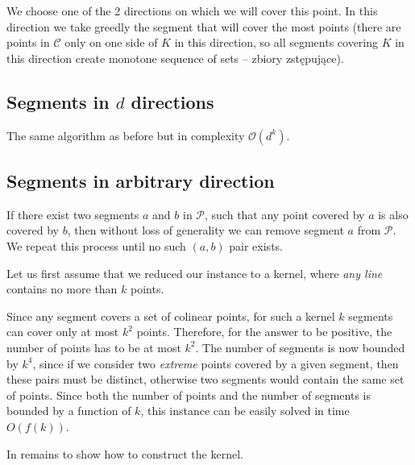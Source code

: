 \documentclass[en]{pracamgr}
\newcommand{\points}{\mathcal{C}}
\newcommand{\sets}{\mathcal{P}}
\begin{document}
We choose one of the 2 directions on which we will cover this point.
In this direction we take greedly the segment that will cover
the most points (there are points in $\points$ only on
one side of $K$ in this direction, so all
segments covering $K$ in this direction create monotone sequence
of sets -- zbiory zstępujące).

\subsection{Segments in $d$ directions}
The same algorithm as before but in complexity $\mathcal{O}(d^k)$.

\subsection{Segments in arbitrary direction}
If there exist two segments $a$ and $b$ in $\sets$,
such that any point covered by $a$ is also covered by $b$,
then without loss of generality we can remove segment $a$ from $\sets$.
We repeat this process until no such $(a, b)$ pair exists.


Let us first assume that we reduced our instance to a kernel,
where \textit{any line} contains no more than $k$ points.

Since any segment covers a set of colinear points,
for such a kernel $k$ segments can cover only at most $k^2$ points.
Therefore, for the answer to be positive,
the number of points has to be at most $k^2$.
The number of segments is now bounded by $k^4$,
since if we consider two \textit{extreme} points
covered by a given segment,
then these pairs must be distinct,
otherwise two segments would contain the same set of points.
Since both the number of points and the number of segments
is bounded by a function of $k$,
this instance can be easily solved in time $O(f(k))$.

In remains to show how to construct the kernel.


\end{document}
